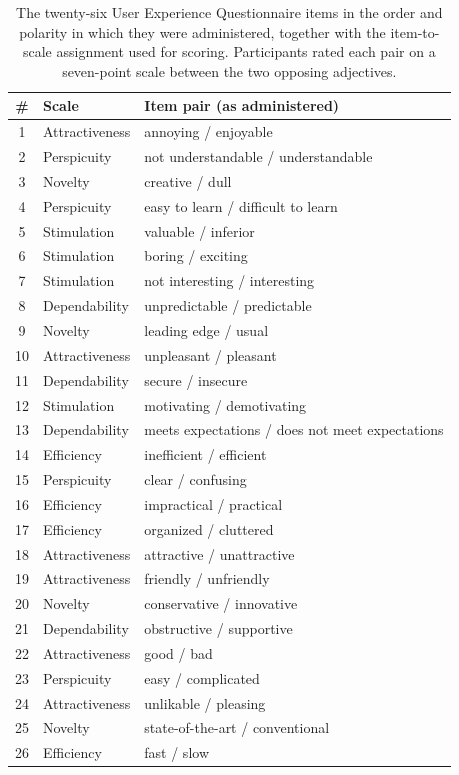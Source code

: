\begin{table}[!htbp]
    \centering
    \small
    \begin{tabular}{clp{9.0cm}}
        \toprule
        \# & Scale & Item pair (as administered) \\
        \midrule
         1 & Attractiveness & annoying / enjoyable \\
         2 & Perspicuity    & not understandable / understandable \\
         3 & Novelty        & creative / dull \\
         4 & Perspicuity    & easy to learn / difficult to learn \\
         5 & Stimulation    & valuable / inferior \\
         6 & Stimulation    & boring / exciting \\
         7 & Stimulation    & not interesting / interesting \\
         8 & Dependability  & unpredictable / predictable \\
         9 & Novelty        & leading edge / usual \\
        10 & Attractiveness & unpleasant / pleasant \\
        11 & Dependability  & secure / insecure \\
        12 & Stimulation    & motivating / demotivating \\
        13 & Dependability  & meets expectations / does not meet expectations \\
        14 & Efficiency     & inefficient / efficient \\
        15 & Perspicuity    & clear / confusing \\
        16 & Efficiency     & impractical / practical \\
        17 & Efficiency     & organized / cluttered \\
        18 & Attractiveness & attractive / unattractive \\
        19 & Attractiveness & friendly / unfriendly \\
        20 & Novelty        & conservative / innovative \\
        21 & Dependability  & obstructive / supportive \\
        22 & Attractiveness & good / bad \\
        23 & Perspicuity    & easy / complicated \\
        24 & Attractiveness & unlikable / pleasing \\
        25 & Novelty        & state-of-the-art / conventional \\
        26 & Efficiency     & fast / slow \\
        \bottomrule
    \end{tabular}
    \caption{The twenty-six User Experience Questionnaire items in the order and polarity in which they were administered, together with the item-to-scale assignment used for scoring. Participants rated each pair on a seven-point scale between the two opposing adjectives.}
    \label{tab:app-ueq-items}
\end{table}

